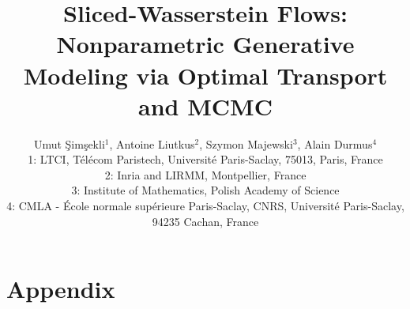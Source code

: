 \documentclass[11pt]{article}
\begin{document}
\title{Sliced-Wasserstein Flows: Nonparametric Generative Modeling via Optimal Transport and MCMC}
\author{Umut \c{S}im\c{s}ekli$^{\text{1}}$, Antoine Liutkus$^{\text{2}}$, Szymon Majewski$^{\text{3}}$, Alain Durmus$^{\text{4}}$  \vspace{3pt} \\
{\small 1: LTCI, T\'{e}l\'{e}com Paristech, Universit\'{e} Paris-Saclay, 75013, Paris, France }\\
{\small 2: Inria and LIRMM, Montpellier, France}\\
{\small 3: Institute of Mathematics, Polish Academy of Science}\\
{\small 4: CMLA - \'{E}cole normale sup\'{e}rieure Paris-Saclay, CNRS, Universit\'{e} Paris-Saclay, 94235 Cachan, France}}
\date{}

\maketitle





\tableofcontents





















\section*{Appendix}




\end{document}
